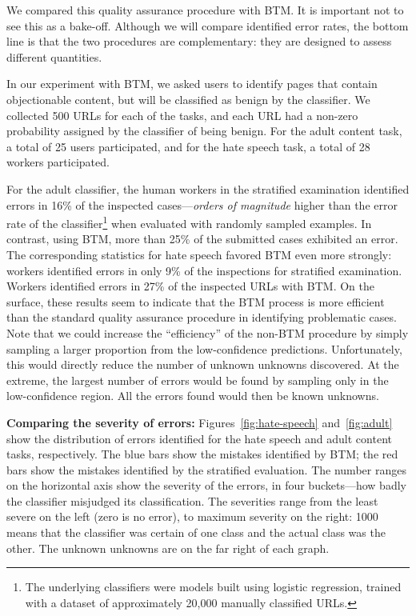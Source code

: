 We compared this quality assurance procedure with BTM.  It is important not to see this as a bake-off.  Although we will compare identified error rates, the bottom line is that the two procedures are complementary: they are designed to assess different quantities.

In our experiment with BTM, we asked users to identify pages that contain objectionable content, but will be classified as benign by the classifier. We collected 500 URLs for each of the tasks, and each URL had a non-zero probability assigned by the classifier of being benign. For the adult content task, a total of 25 users participated, and for the hate speech task, a total of 28 workers participated. 

For the adult classifier, the human workers in the stratified examination identified errors in 16\% of the inspected cases---\textit{orders of magnitude} higher than the error rate of the classifier\footnote{The underlying classifiers were models built using logistic regression, trained with a dataset of approximately 20,000 manually classified URLs.} when evaluated with randomly sampled examples. In contrast, using BTM, more than 25\% of the submitted cases exhibited an error. The corresponding statistics for hate speech favored BTM even more strongly: workers identified errors in only 9\% of the inspections for stratified examination.  Workers identified errors in 27\% of the inspected URLs with BTM. On the surface, these results seem to indicate that the BTM process is more efficient than the standard quality assurance procedure in identifying problematic cases.  Note that we could increase the ``efficiency'' of the non-BTM procedure by simply sampling a larger proportion from the low-confidence predictions. Unfortunately, this would directly reduce the number of unknown unknowns discovered.  At the extreme, the largest number of errors would be found by sampling only in the low-confidence region.  All the errors found would then be known unknowns.



\textbf{Comparing the severity of errors:} Figures~\ref{fig:hate-speech} and~\ref{fig:adult} show the distribution of errors identified for the hate speech and adult content tasks, respectively.  The blue bars show the mistakes identified by BTM; the red bars show the mistakes identified by the stratified evaluation.   The number ranges on the horizontal axis show the severity of the errors, in four buckets---how badly the classifier misjudged its classification.  The severities range from the least severe on the left (zero is no error), to maximum severity on the right: 1000 means that the classifier was certain of one class and the actual class was the other.  The unknown unknowns are on the far right of each graph.

